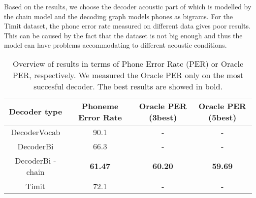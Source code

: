 Based on the results, we choose the decoder acoustic part of which is modelled by the chain model and the decoding graph models phones as bigrams.
For the Timit dataset, the phone error rate measured on different data gives poor results.
This can be caused by the fact that the dataset is not big enough and thus the model can have problems accommodating to different acoustic conditions. 
\begin{table}
\centering
\begin{tabular}{ |c|c|c|c| } 
 \hline
 Decoder type & Phoneme Error Rate & Oracle PER (3best) & Oracle PER (5best) \\ 
 \hline
 DecoderVocab & 90.1 & - & - \\ 
 \hline
 DecoderBi & 66.3 & - & - \\
 \hline
 DecoderBi - chain & \textbf{61.47} & \textbf{60.20} & \textbf{59.69} \\
 \hline
 Timit & 72.1 & - & - \\
 \hline
\end{tabular}
\label{PERtable}
\caption{Overview of results in terms of Phone Error Rate (PER) or Oracle PER, respectively. We measured the Oracle PER only on the most succesful decoder. The best results are showed in bold.}
\end{table}
